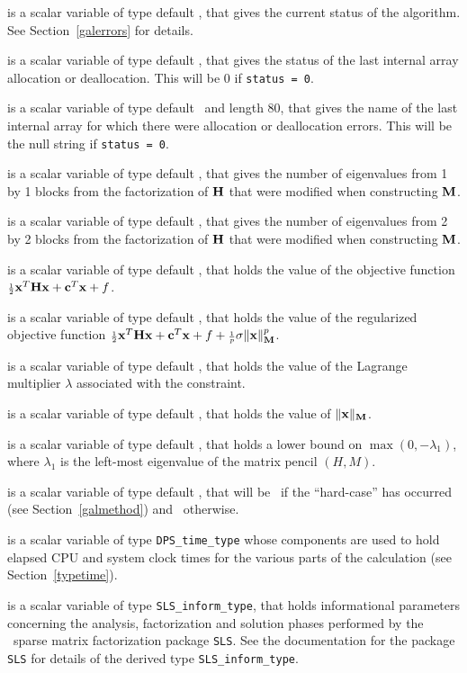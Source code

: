 \documentclass{galahad}
\newcommand{\packagename}{DPS}
\begin{document}
\begin{description}
 is a scalar variable of type default \integer, that gives the
current status of the algorithm. See Section~\ref{galerrors} for details.

 is a scalar variable of type default \integer,
that gives the status of the last internal array allocation
or deallocation. This will be 0 if {\tt status = 0}.

 is a scalar variable of type default \character\
and length 80, that  gives the name of the last internal array
for which there were allocation or deallocation errors.
This will be the null string if {\tt status = 0}.

 is a scalar variable of type default \integer,
that gives the number of eigenvalues from 1 by 1 blocks from the
factorization of ${\mathbf{H}}$ that were modified when constructing ${\mathbf{M}}$.

 is a scalar variable of type default \integer,
that gives the number of eigenvalues from 2 by 2 blocks from the
factorization of ${\mathbf{H}}$ that were modified when constructing ${\mathbf{M}}$.

 is a scalar variable of type default \realdp, that holds the
value of the objective function ${\scriptstyle \frac{1}{2}} {\mathbf{x}}^T {\mathbf{H}} {\mathbf{x}}  +  {\mathbf{c}}^T {\mathbf{x}} + f$.

 is a scalar variable of type default \realdp, that
holds the value of the regularized objective function ${\scriptstyle \frac{1}{2}} {\mathbf{x}}^T {\mathbf{H}} {\mathbf{x}}
 + {\mathbf{c}}^T {\mathbf{x}} + f + {\scriptstyle \frac{1}{p}} \sigma \|{\mathbf{x}}\|_{{\mathbf{M}}}^p$.

 is a scalar variable of type default \realdp, that holds the
value of the Lagrange multiplier $\lambda$ associated with the constraint.

 is a scalar variable of type default \realdp,
that holds the value of $\|{\mathbf{x}}\|_{{\mathbf{M}}}$.

 is a scalar variable of type default \realdp, that holds a lower
bound on $\max(0,-\lambda_1)$, where $\lambda_1$ is the left-most eigenvalue of
the matrix pencil $(H,M)$.

 is a scalar variable of type default \logical, that will be
\true\ if the ``hard-case'' has occurred (see Section~\ref{galmethod})
and \false\ otherwise.

 is a scalar variable of type {\tt \packagename\_time\_type}
whose components are used to hold elapsed CPU  and system clock times for the
various parts of the calculation (see Section~\ref{typetime}).

 is a scalar variable of type {\tt SLS\_inform\_type},
that holds informational parameters concerning the analysis, factorization
and solution phases performed by
the \galahad\ sparse matrix factorization package {\tt SLS}.
See the documentation for the package {\tt SLS} for details of the
derived type {\tt SLS\_inform\_type}.

\end{description}
\end{document}
